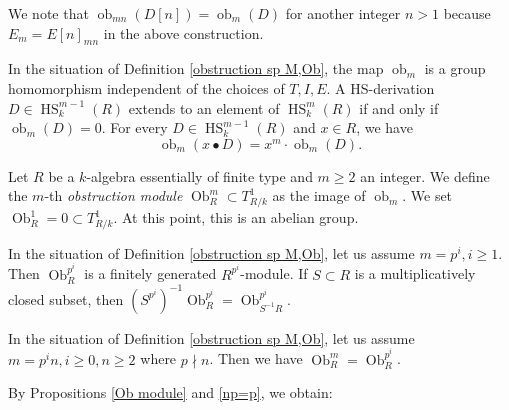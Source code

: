 \documentclass{amsart}
\begin{document}
We note that $\operatorname{ob}_{mn}(D[n])=\operatorname{ob}_{m}(D)$ for another integer $n>1$ because $E_{m}=E[n]_{mn}$ in the above construction.

\begin{proposition}[{= \cite[Proposition 2.12]{miy2025}}]\label{obstruction independence} In the situation of Definition \ref{obstruction sp M,Ob}, the map $\operatorname{ob}_m$ is a group homomorphism independent of the choices of $T, I, E$. A HS-derivation $D\in \operatorname{HS}_k^{m-1}(R)$ extends to an element of $\operatorname{HS}_k^{m}(R)$ if and only if $\operatorname{ob}_m(D)=0$. For every $D\in \operatorname{HS}_k^{m-1}(R)$ and $x\in R$, we have $$\operatorname{ob}_m(x\bullet D)=x^m\cdot \operatorname{ob}_m(D).$$
\end{proposition}


\begin{definition}[{= \cite[Definition 2.13]{miy2025}}]\label{Ob}
  Let $R$ be a $k$-algebra essentially of finite type and $m\ge 2 $ an integer.  We define the $m$-th \emph{obstruction module} $\operatorname{Ob}^m_R\subset T^1_{R/k}$ as the image of $\operatorname{ob}_m$. We set $\operatorname{Ob}_R^{1}=0\subset T^1_{R/k}$. At this point, this is an abelian group.
\end{definition}

\begin{proposition}[{= \cite[Proposition 2.14]{miy2025}}]\label{Ob module}
In the situation of Definition \ref{obstruction sp M,Ob}, let us assume $m=p^i, i\ge1$. Then $\operatorname{Ob}^{p^i}_R$ is a finitely generated $R^{p^i}$-module.  If $S\subset R$ is a multiplicatively closed subset, then $(S^{p^i})^{-1}\operatorname{Ob}_R^{p^i}=\operatorname{Ob}^{p^i}_{S^{-1}R}$. %
\end{proposition}

\begin{proposition}[{= \cite[Proposition 2.16]{miy2025}}]\label{np=p}
In the situation of Definition \ref{obstruction sp M,Ob}, let us assume $m=p^in,i\ge0,n\ge2$ where $p\nmid n$. Then we have $\operatorname{Ob}^m_R=\operatorname{Ob}^{p^i}_R$.
\end{proposition}

By Propositions \ref{Ob module} and \ref{np=p}, we obtain:
\end{document}
